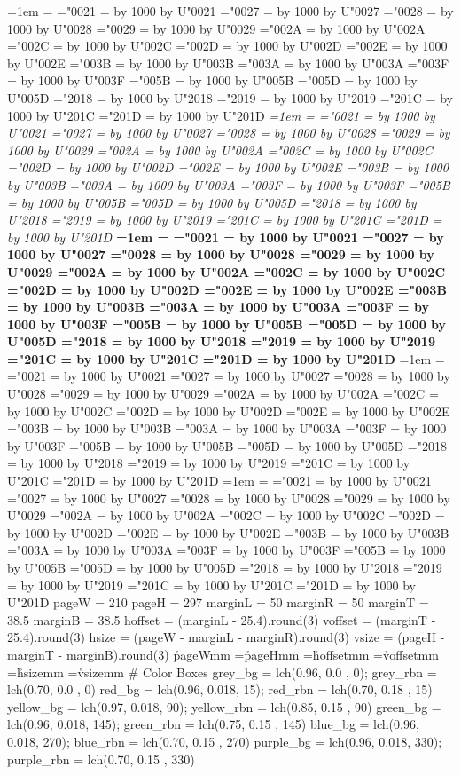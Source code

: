 \newbox\testbox
\newcount\testem
\newcount\testwd
\def\setrpcode#1#2{%
  \setbox\testbox=\hbox{\char#2}%
  \testwd=\wd\testbox
  \multiply\testwd by 1000
  \divide\testwd by\testem
  \rpcode#1 U#2 \the\testwd
}%
\def\setlpcode#1#2{%
  \setbox\testbox=\hbox{\char#2}%
  \testwd=\wd\testbox
  \multiply\testwd by 1000
  \divide\testwd by\testem
  \lpcode#1 U#2 \the\testwd
}%
\def\setpcodes#1{%
  {#1%
    \setbox\testbox=\hbox{\kern1em}%
    \testem=\wd\testbox
    \setrpcode{#1}{"0021}%
    \setlpcode{#1}{"0027}%
    \setlpcode{#1}{"0028}%
    \setrpcode{#1}{"0029}%
    \setrpcode{#1}{"002A}%
    \setrpcode{#1}{"002C}%
    \setrpcode{#1}{"002D}%
    \setrpcode{#1}{"002E}%
    \setrpcode{#1}{"003B}%
    \setrpcode{#1}{"003A}%
    \setrpcode{#1}{"003F}%
    \setlpcode{#1}{"005B}%
    \setrpcode{#1}{"005D}%
    \setlpcode{#1}{"2018}%
    \setrpcode{#1}{"2019}%
    \setlpcode{#1}{"201C}%
    \setrpcode{#1}{"201D}%
  }%
}%
\setpcodes{\rm}%
\setpcodes{\it}%
\setpcodes{\bf}%
\setpcodes{\caps}%
\setpcodes{\icap}%
\def\url#1#2{%
  \special{pdf:bann <<
    /Subtype /Link
    /A << %
      /S /URI %
      /URI (#1)
    >>
    /Border [ 0 0 0 ] %
    /C [ 1 0 0 ] %
  >>}%
  #2\special{pdf:eann}%
}%
\def\qt{\kern -1.0pt}%
\def\ot{\kern  0.5pt}%
\def\pt{\kern  1.0pt}%
\def\dt{\kern  2.0pt}%
\def\fem{\hskip 0.200em}%
\def\qem{\hskip 0.250em}%
\def\tem{\hskip 0.333em}%
\def\hem{\hskip 0.500em}%
\def\em {\hskip 1.000em}%
\def\dem{\hskip 2.000em}%
\beginruby
  pageW   = 210
  pageH   = 297
  marginL =  50
  marginR =  50
  marginT =  38.5
  marginB =  38.5
  hoffset = (marginL - 25.4).round(3)
  voffset = (marginT - 25.4).round(3)
  hsize   = (pageW - marginL - marginR).round(3)
  vsize   = (pageH - marginT - marginB).round(3)
\endruby
\pdfpagewidth\r{pageW}mm
\pdfpageheight=\r{pageH}mm
\hoffset=\r{hoffset}mm
\voffset=\r{voffset}mm
\hsize=\r{hsize}mm
\vsize=\r{vsize}mm
\baselineskip=16pt
\parskip=8pt
\parindent=0pt
\raggedbottom
\nopagenumbers
\beginruby
  # Color Boxes
    grey_bg = lch(0.96, 0.0  ,   0);   grey_rbn = lch(0.70, 0.0  ,   0)
     red_bg = lch(0.96, 0.018,  15);    red_rbn = lch(0.70, 0.18 ,  15)
  yellow_bg = lch(0.97, 0.018,  90); yellow_rbn = lch(0.85, 0.15 ,  90)
   green_bg = lch(0.96, 0.018, 145);  green_rbn = lch(0.75, 0.15 , 145)
    blue_bg = lch(0.96, 0.018, 270);   blue_rbn = lch(0.70, 0.15 , 270)
  purple_bg = lch(0.96, 0.018, 330); purple_rbn = lch(0.70, 0.15 , 330)

